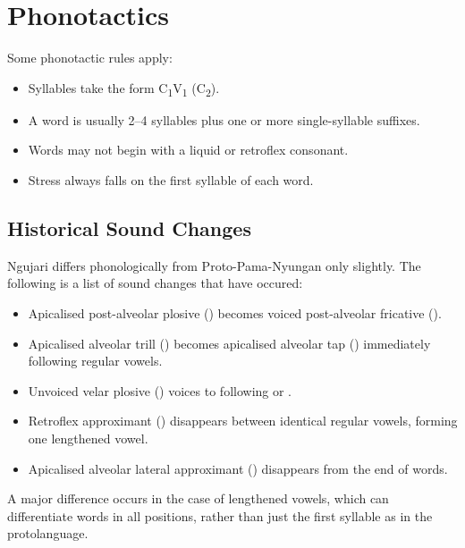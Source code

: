 \section{Phonotactics}

Some phonotactic rules apply:

\begin{itemize}
\item Syllables take the form C\textsubscript{1}V\textsubscript{1} (C\textsubscript{2}).
\item A word is usually 2--4 syllables plus one or more single-syllable suffixes.
\item Words may not begin with a liquid or retroflex consonant.
\item Stress always falls on the first syllable of each word.
\end{itemize}

\subsection{Historical Sound Changes}

Ngujari differs phonologically from Proto-Pama-Nyungan only slightly. The
following is a list of sound changes that have occured:

\begin{itemize}
\item Apicalised post-alveolar plosive () becomes
  voiced post-alveolar fricative ().
\item Apicalised alveolar trill (\textipa{\|]r}) becomes apicalised alveolar tap
  (\textipa{\|]R}) immediately following regular vowels.
\item Unvoiced velar plosive () voices to  following
   or .
\item Retroflex approximant () disappears between identical regular
  vowels, forming one lengthened vowel.
\item Apicalised alveolar lateral approximant (\textipa{\|]l}) disappears from
  the end of words.
\end{itemize}

A major difference occurs in the case of lengthened vowels, which can
differentiate words in all positions, rather than just the first syllable as in
the protolanguage.

